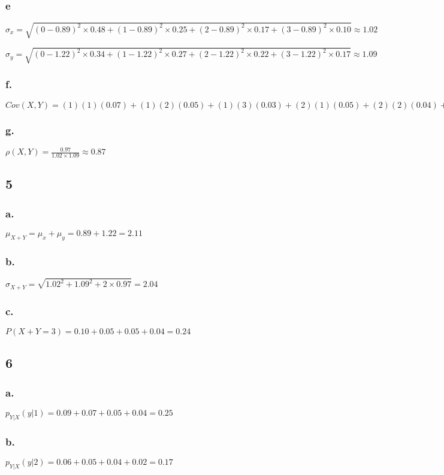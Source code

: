 \documentclass[11pt]{article}
\begin{document}
\subsubsection{e}
$\sigma_x = \sqrt{(0-0.89)^2 \times 0.48 + (1-0.89)^2 \times 0.25 + (2-0.89)^2
\times 0.17 + (3-0.89)^2 \times 0.10 } \approx 1.02$

$\sigma_y = \sqrt{(0-1.22)^2 \times 0.34 + (1-1.22)^2 \times 0.27 + (2-1.22)^2
\times 0.22 + (3-1.22)^2 \times 0.17 } \approx 1.09$

\subsubsection{f.}
$Cov(X,Y) =
(1)(1)(0.07)+(1)(2)(0.05)+(1)(3)(0.03)+(2)(1)(0.05)+(2)(2)(0.04)+(2)(3)(0.02)+(3)(1)(0.04)+(3)(2)(0.02)+(3)(3)(0.01)
= 0.97$

\subsubsection{g.}
$\rho(X,Y)=\frac{0.97}{1.02\times1.09}\approx 0.87$

\subsection{5}
\subsubsection{a.}
$\mu_{X+Y} = \mu_x+\mu_y = 0.89+1.22 = 2.11$

\subsubsection{b.}
$\sigma_{X+Y} = \sqrt{1.02^2 + 1.09^2 + 2 \times 0.97} = 2.04$

\subsubsection{c.}
$P(X+Y=3) = 0.10+0.05+0.05+0.04 = 0.24$

\subsection{6}
\subsubsection{a.}
$p_{Y|X}(y|1) = 0.09+0.07+0.05+0.04 = 0.25$ 

\subsubsection{b.}
$p_{Y|X}(y|2) = 0.06+0.05+0.04+0.02 = 0.17$ 
\end{document}
